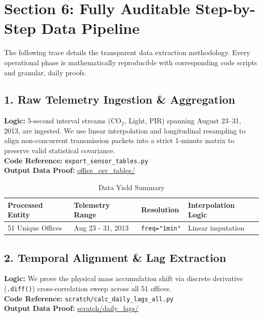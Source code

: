 \documentclass[11pt,a4paper]{article}
\begin{document}
\section{Section 6: Fully Auditable Step-by-Step Data Pipeline}
The following trace details the transparent data extraction methodology. Every operational phase is mathematically reproducible with corresponding code scripts and granular, daily proofs.

\subsection{1. Raw Telemetry Ingestion \& Aggregation}
\textbf{Logic:} 5-second interval streams (CO$_2$, Light, PIR) spanning August 23--31, 2013, are ingested. We use linear interpolation and longitudinal resampling to align non-concurrent transmission packets into a strict 1-minute matrix to preserve valid statistical covariance. \\
\textbf{Code Reference:} \texttt{export\_sensor\_tables.py} \\
\textbf{Output Data Proof:} \href{https://github.com/NITAAIPractitioners/OpenStudio_Project/tree/main/office_csv_tables}{office\_csv\_tables/} 

\begin{table}[h]
\centering
\caption{Data Yield Summary}
\begin{tabular}{@{}llll@{}}
\toprule
\textbf{Processed Entity} & \textbf{Telemetry Range} & \textbf{Resolution} & \textbf{Interpolation Logic} \\ \midrule
51 Unique Offices         & Aug 23 - 31, 2013        & \texttt{freq="1min"} & Linear imputation           \\ \bottomrule
\end{tabular}
\end{table}

\subsection{2. Temporal Alignment \& Lag Extraction}
\textbf{Logic:} We prove the physical mass accumulation shift via discrete derivative (\texttt{.diff()}) cross-correlation sweep across all 51 offices. \\
\textbf{Code Reference:} \texttt{scratch/calc\_daily\_lags\_all.py} \\
\textbf{Output Data Proof:} \href{https://github.com/NITAAIPractitioners/OpenStudio_Project/tree/main/scratch/daily_lags}{scratch/daily\_lags/}
\end{document}
